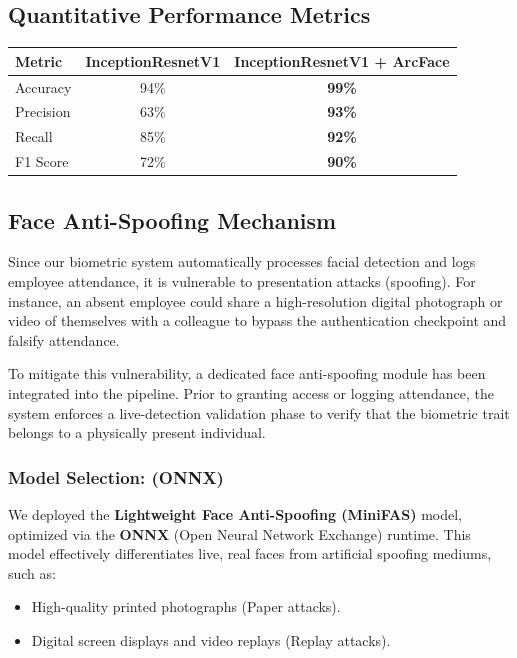 \documentclass[sommairechap,stylejchiquet]{these_gi}
\begin{document}
\subsection{Quantitative Performance Metrics}
\begin{center}
    
\begin{tabular}{|l|c|c|}
\hline
Metric    & InceptionResnetV1 & InceptionResnetV1 + ArcFace \\
\hline
Accuracy  & 94\%      & \textbf{99\%}    \\      
\hline
Precision & 63\%      & \textbf{93\%}       \\   
\hline
Recall    & 85\%      & \textbf{92\%}     \\     
\hline
F1 Score  & 72\%      & \textbf{90\%}  \\ 
\hline

\end{tabular}
\end{center}

\subsection{Face Anti-Spoofing Mechanism}

Since our biometric system automatically processes facial detection and logs employee attendance, it is vulnerable to presentation attacks (spoofing). For instance, an absent employee could share a high-resolution digital photograph or video of themselves with a colleague to bypass the authentication checkpoint and falsify attendance.

To mitigate this vulnerability, a dedicated face anti-spoofing module has been integrated into the pipeline. Prior to granting access or logging attendance, the system enforces a live-detection validation phase to verify that the biometric trait belongs to a physically present individual.

\subsubsection{Model Selection:  (ONNX)}
We deployed the \textbf{Lightweight Face Anti-Spoofing (MiniFAS)} model, optimized via the \textbf{ONNX} (Open Neural Network Exchange) runtime. This model effectively differentiates live, real faces from artificial spoofing mediums, such as:
\begin{itemize}
    \item High-quality printed photographs (Paper attacks).
    \item Digital screen displays and video replays (Replay attacks).
\end{itemize}
\end{document}
